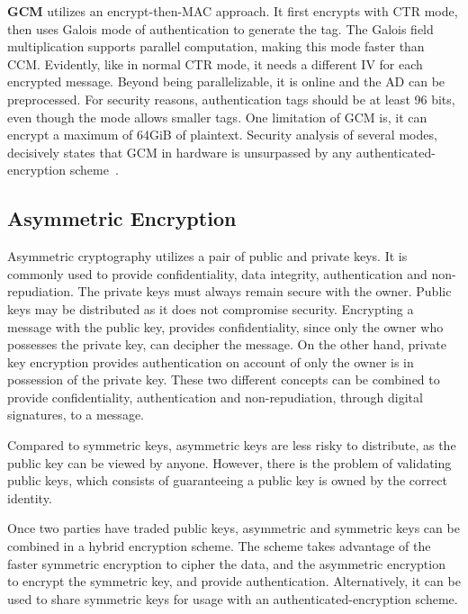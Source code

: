\textbf{\ac{GCM}} utilizes an encrypt-then-MAC approach. It first encrypts with \ac{CTR} mode, then uses Galois mode of authentication to generate the tag. The Galois field multiplication supports parallel computation, making this mode faster than \ac{CCM}.
Evidently, like in normal \ac{CTR} mode, it needs a different \ac{IV} for each encrypted message.
Beyond being parallelizable, it is online and the \ac{AD} can be preprocessed.
For security reasons, authentication tags should be at least 96 bits, even though the mode allows smaller tags. One limitation of \ac{GCM} is, it can encrypt a maximum of 64GiB of plaintext. Security analysis of several modes, decisively states that \ac{GCM} in hardware is unsurpassed by any authenticated-encryption scheme~\cite{aesmodes}.


\subsection{Asymmetric Encryption}\label{chap:background:crypto:assymetric}

Asymmetric cryptography utilizes a pair of public and private keys. It is commonly used to provide confidentiality, data integrity, authentication and non-repudiation.
The private keys must always remain secure with the owner. Public keys may be distributed as it does not compromise security. Encrypting a message with the public key, provides confidentiality, since only the owner who possesses the private key, can decipher the message. On the other hand, private key encryption provides authentication on account of only the owner is in possession of the private key. These two different concepts can be combined to provide confidentiality, authentication and non-repudiation, through digital signatures, to a message.

Compared to symmetric keys, asymmetric keys are less risky to distribute, as the public key can be viewed by anyone. However, there is the problem of validating public keys, which consists of guaranteeing a public key is owned by the correct identity.

Once two parties have traded public keys, asymmetric and symmetric keys can be combined in a hybrid encryption scheme. The scheme takes advantage of the faster symmetric encryption to cipher the data, and the asymmetric encryption to encrypt the symmetric key, and provide authentication. Alternatively, it can be used to share symmetric keys for usage with an authenticated-encryption scheme.

